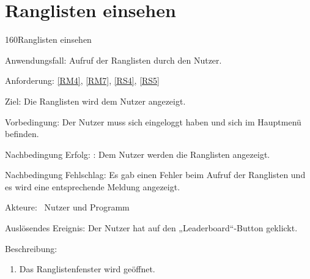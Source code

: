 \section{Ranglisten einsehen}
\begin{function}{160}{Ranglisten einsehen}
\item[Anwendungsfall:] Aufruf der Ranglisten durch den Nutzer.
\item[Anforderung:] \ref{RM4}, \ref{RM7}, \ref{RS4}, \ref{RS5}
\item[Ziel:] Die Ranglisten wird dem Nutzer angezeigt.
\item[Vorbedingung:] Der Nutzer muss sich eingeloggt haben und sich im Hauptmenü befinden.
\item[Nachbedingung Erfolg:]  : Dem Nutzer werden die Ranglisten angezeigt.
\item[Nachbedingung Fehlschlag:] Es gab einen Fehler beim Aufruf der Ranglisten und es wird eine entsprechende Meldung angezeigt.
\item[Akteure:] ~Nutzer und Programm
\item[Auslösendes Ereignis:] Der Nutzer hat auf den „Leaderboard“-Button geklickt.
\item[Beschreibung:] ~
\begin{enumerate}
  \item  Das Ranglistenfenster wird geöffnet.
\end{enumerate}
\end{function}

